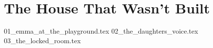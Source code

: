 \section{The House That Wasn't Built}

{01_emma_at_the_playground.tex}
{02_the_daughters_voice.tex}
{03_the_locked_room.tex}